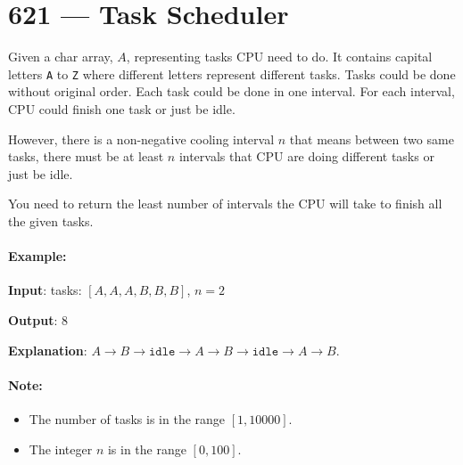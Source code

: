 \section{621 --- Task Scheduler}
Given a char array, $A$, representing tasks CPU need to do. It contains capital letters \texttt{A} to \texttt{Z} where different letters represent different tasks. Tasks could be done without original order. Each task could be done in one interval. For each interval, CPU could finish one task or just be idle.

However, there is a non-negative cooling interval $n$ that means between two same tasks, there must be at least $n$ intervals that CPU are doing different tasks or just be idle.

You need to return the least number of intervals the CPU will take to finish all the given tasks.
 

\paragraph{Example:}

\begin{flushleft}
\textbf{Input}: tasks: $[A, A, A, B, B, B]$, $n = 2$

\textbf{Output}: 8

\textbf{Explanation}: $A \longrightarrow B \longrightarrow \texttt{idle} \longrightarrow A \longrightarrow B \longrightarrow \texttt{idle} \longrightarrow A \longrightarrow B$.

\end{flushleft}
 

\paragraph{Note:}

\begin{itemize}
\item The number of tasks is in the range $[1, 10000]$.
\item The integer $n$ is in the range $[0, 100]$.

\end{itemize}


